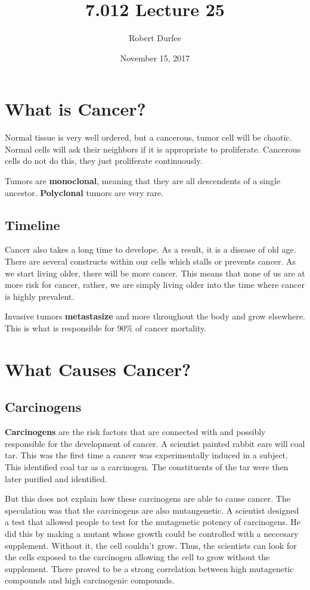 \documentclass{article}
\title{ 7.012 Lecture 25 }
\author{ Robert Durfee }
\date{ November 15, 2017 }
\begin{document}
\maketitle

\section{ What is Cancer? }

Normal tissue is very well ordered, but a cancerous, tumor cell will be chaotic.
Normal cells will ask their neighbors if it is appropriate to proliferate.
Cancerous cells do not do this, they just proliferate continuously. 

Tumors are \textbf{monoclonal}, meaning that they are all descendents of a single
ancestor. \textbf{Polyclonal} tumors are very rare. 

\subsection{Timeline}

Cancer also takes a long time to develope. As a result, it is a disease of old
age. There are several constructs within our cells which stalls or prevents
cancer. As we start living older, there will be more cancer. This means that
none of us are at more risk for cancer, rather, we are simply living older into
the time where cancer is highly prevalent.

Invasive tumors \textbf{metastasize} and more throughout the body and grow
elsewhere. This is what is responsible for 90\% of cancer mortality. 

\section{What Causes Cancer?}

\subsection{Carcinogens}

\textbf{Carcinogens} are the risk factors that are connected with and possibly
responsible for the development of cancer. A scientist painted rabbit ears will
coal tar. This was the first time a cancer was experimentally induced in a
subject. This identified coal tar as a carcinogen. The constituents of the tar
were then later purified and identified.

But this does not explain how these carcinogens are able to cause cancer. The
speculation was that the carcinogens are also mutangenetic. A scientist designed
a test that allowed people to test for the mutagenetic potency of carcinogens.
He did this by making a mutant whose growth could be controlled with a neccesary
supplement. Without it, the cell couldn't grow. Thus, the scientists can look
for the cells exposed to the carcinogen allowing the cell to grow without the
supplement. There proved to be a strong correlation between high mutagenetic
compounds and high carcinogenic compounds.
\end{document}
